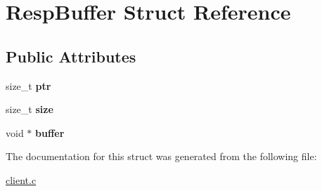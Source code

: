 \hypertarget{structRespBuffer}{\section{\-Resp\-Buffer \-Struct \-Reference}
\label{structRespBuffer}
}
\subsection*{\-Public \-Attributes}
\begin{DoxyCompactItemize}
\item 
\hypertarget{structRespBuffer_ad8a00fd4b32fd0ea3cd9349535786f58}{size\-\_\-t {\bfseries ptr}}\label{structRespBuffer_ad8a00fd4b32fd0ea3cd9349535786f58}

\item 
\hypertarget{structRespBuffer_a50c33808110f6b66c96d9cd314edbfc7}{size\-\_\-t {\bfseries size}}\label{structRespBuffer_a50c33808110f6b66c96d9cd314edbfc7}

\item 
\hypertarget{structRespBuffer_a7883bc7a2127524d6736b9d81834fbdb}{void $\ast$ {\bfseries buffer}}\label{structRespBuffer_a7883bc7a2127524d6736b9d81834fbdb}

\end{DoxyCompactItemize}


\-The documentation for this struct was generated from the following file\-:\begin{DoxyCompactItemize}
\item 
\hyperlink{client_8c}{client.\-c}\end{DoxyCompactItemize}

